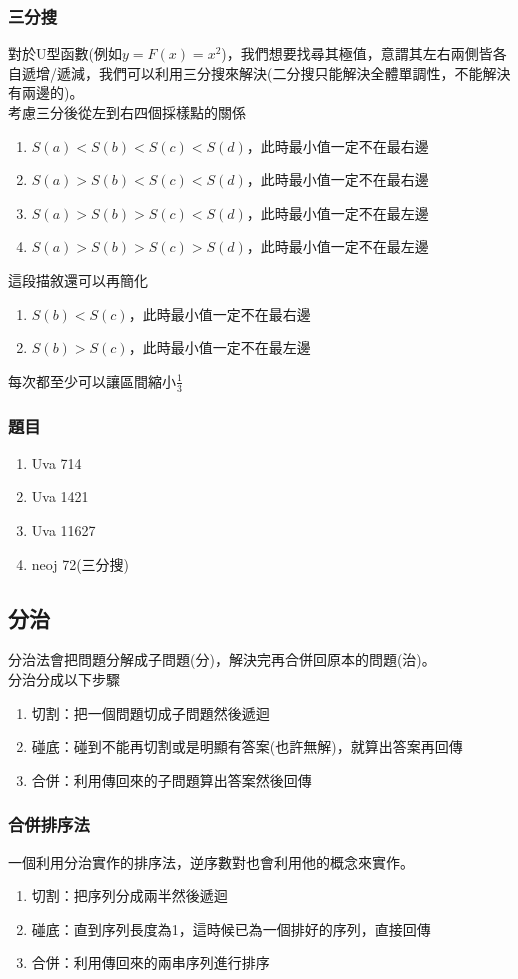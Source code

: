 \subsubsection{三分搜}
對於U型函數(例如$y=F(x)=x^2$)，我們想要找尋其極值，意謂其左右兩側皆各自遞增/遞減，我們可以利用三分搜來解決(二分搜只能解決全體單調性，不能解決有兩邊的)。\\
考慮三分後從左到右四個採樣點的關係
\begin{enumerate}
\item $S(a) < S(b) < S(c) < S(d)$，此時最小值一定不在最右邊
\item $S(a) > S(b) < S(c) < S(d)$，此時最小值一定不在最右邊
\item $S(a) > S(b) > S(c) < S(d)$，此時最小值一定不在最左邊
\item $S(a) > S(b) > S(c) > S(d)$，此時最小值一定不在最左邊
\end{enumerate}
這段描敘還可以再簡化
\begin{enumerate}
\item $S(b) < S(c)$，此時最小值一定不在最右邊
\item $S(b) > S(c)$，此時最小值一定不在最左邊
\end{enumerate}
每次都至少可以讓區間縮小$\frac{1}{3}$

\subsubsection{題目}
\begin{enumerate}
\item Uva 714
\item Uva 1421
\item Uva 11627
\item neoj 72(三分搜)
\end{enumerate}
\subsection{分治}
分治法會把問題分解成子問題(分)，解決完再合併回原本的問題(治)。\\
分治分成以下步驟
\begin{enumerate}
\item 切割：把一個問題切成子問題然後遞迴
\item 碰底：碰到不能再切割或是明顯有答案(也許無解)，就算出答案再回傳
\item 合併：利用傳回來的子問題算出答案然後回傳
\end{enumerate}
\subsubsection{合併排序法}
一個利用分治實作的排序法，逆序數對也會利用他的概念來實作。
\begin{enumerate}
\item 切割：把序列分成兩半然後遞迴
\item 碰底：直到序列長度為1，這時候已為一個排好的序列，直接回傳
\item 合併：利用傳回來的兩串序列進行排序
\end{enumerate}

